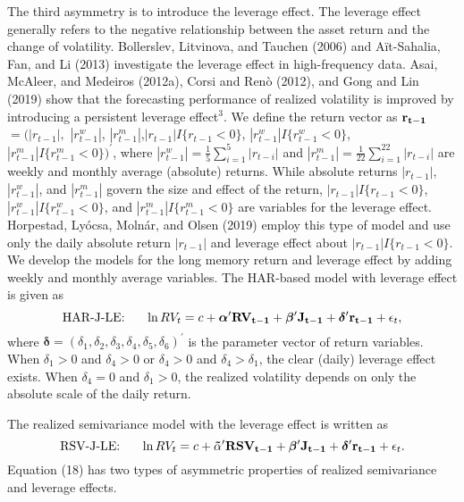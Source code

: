 \documentclass[10pt]{article}
\begin{document}
The third asymmetry is to introduce the leverage effect. 
The leverage effect generally refers to the negative relationship between the asset return and the change of volatility.  
Bollerslev, Litvinova, and Tauchen (2006) and A\"{i}t-Sahalia, Fan, and Li (2013) investigate the leverage effect in high-frequency data. 
Asai, McAleer, and Medeiros (2012a), Corsi and Ren\`{o} (2012), and Gong and Lin (2019) show that the forecasting performance of realized volatility is improved by introducing a persistent leverage effect$^{3}$. 
We define the return vector as ${\bf r_{t-1}}$$=(|r_{t-1}|,$ $|r_{t-1}^w|$, $|r_{t-1}^m|$,$|r_{t-1}|I\{r_{t-1}<0\}$, $|r_{t-1}^w|I\{r_{t-1}^w<0\}$, $|r_{t-1}^m|I\{r_{t-1}^m<0\})^{\prime}$, 
where $|r_{t-1}^w|=\frac{1}{5}\sum_{i=1}^5 |r_{t-i}|$ and  $|r_{t-1}^m|=\frac{1}{22}\sum_{i=1}^{22} |r_{t-i}|$ are weekly and monthly average (absolute) returns. 
While absolute returns $|r_{t-1}|$, $|r_{t-1}^w|$, and $|r_{t-1}^m|$ govern the size and effect of the return, 
$|r_{t-1}|I\{r_{t-1}<0\}$, $|r_{t-1}^w|I\{r_{t-1}^w<0\}$, and $|r_{t-1}^m|I\{r_{t-1}^m<0\}$ are variables for the leverage effect.
Horpestad, Ly\'{o}csa, Moln\'{a}r, and Olsen  (2019) employ this type of model and use only the daily absolute return $|r_{t-1}|$ and leverage effect about $|r_{t-1}|I\{r_{t-1}<0\}$. 
We develop the models for the long memory return and leverage effect by adding weekly and monthly average variables. 
The HAR-based model with leverage effect is given as 
\begin{equation}
\text{HAR-J-LE:} \ \ \ \ \ \ln RV_t=c+{\boldsymbol  \alpha}^{\prime} {\bf RV_{t-1}} +{\boldsymbol  \beta}^{\prime} {\bf J_{t-1}} +{\boldsymbol  \delta}^{\prime} {\bf r_{t-1}} + \epsilon_t, 
\end{equation}
where ${\boldsymbol  \delta}=(\delta_1, \delta_2, \delta_3, \delta_4, \delta_5, \delta_6)^{\prime}$ is the parameter vector of return variables. 
When $\delta_1>0$ and $\delta_4>0$ or $\delta_4 >0$ and $\delta_4>\delta_1$, the clear (daily) leverage effect exists. 
When $\delta_4=0$ and $\delta_1>0$, the realized volatility depends on only the absolute scale of the daily return.  

The realized semivariance model with the leverage effect is written as
\begin{equation}
\text{RSV-J-LE:} \ \ \ \ \ \ln RV_t=c+{\boldsymbol \tilde{\alpha}}^{\prime} {\bf RSV_{t-1}} +{\boldsymbol  \beta}^{\prime} {\bf J_{t-1}} +{\boldsymbol  \delta}^{\prime} {\bf r_{t-1}} + \epsilon_t.  
\end{equation}
Equation (18) has two types of asymmetric properties of realized semivariance and leverage effects. 
\end{document}

